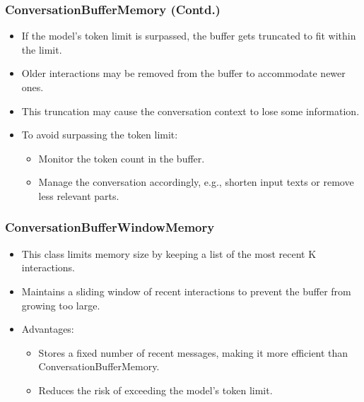 \begin{frame}[fragile]
\frametitle{ConversationBufferMemory (Contd.)}

\begin{itemize}
    \item If the model's token limit is surpassed, the buffer gets truncated to fit within the limit.
    \item Older interactions may be removed from the buffer to accommodate newer ones.
    \item This truncation may cause the conversation context to lose some information.
    \item To avoid surpassing the token limit:
    \begin{itemize}
        \item Monitor the token count in the buffer.
        \item Manage the conversation accordingly, e.g., shorten input texts or remove less relevant parts.
    \end{itemize}
\end{itemize}

\end{frame}

\begin{frame}[fragile]
\frametitle{ConversationBufferWindowMemory}

\begin{itemize}
    \item This class limits memory size by keeping a list of the most recent K interactions.
    \item Maintains a sliding window of recent interactions to prevent the buffer from growing too large.
    \item Advantages:
    \begin{itemize}
        \item Stores a fixed number of recent messages, making it more efficient than ConversationBufferMemory.
        \item Reduces the risk of exceeding the model's token limit.
    \end{itemize}
\end{itemize}

\end{frame}

